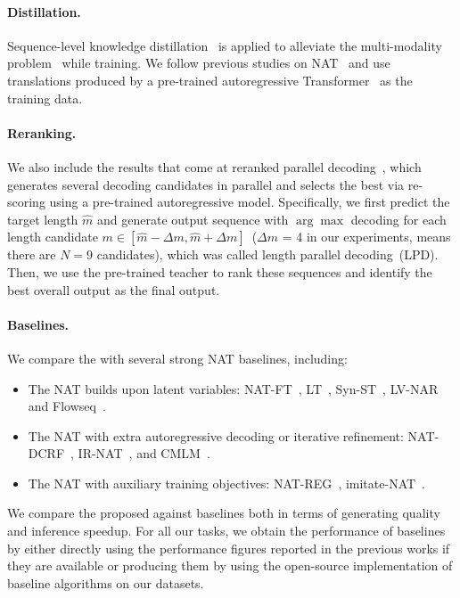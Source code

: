 \paragraph{Distillation.}
Sequence-level knowledge distillation~\citep{hinton2015distilling} is applied to alleviate the multi-modality problem~\cite{nat} while training. 
We follow previous studies on NAT~\citep{nat,iter_nat,imitate_nat} and use translations produced by a pre-trained autoregressive Transformer~\cite{transformer} as the training data.

\paragraph{Reranking.}
We also include the results that come at reranked parallel decoding~\citep{nat,enat,nat_reg,imitate_nat}, which generates several decoding candidates in parallel and selects the best via re-scoring using a pre-trained autoregressive model. 
Specifically, we first predict the target length $\hat{m}$ and generate output sequence with $\arg\max$ decoding for each length candidate $m \in [\hat{m}-\Delta m, \hat{m}+\Delta m ]$~($\Delta m$ = 4 in our experiments, means there are $N=9$ candidates), which was called length parallel decoding~(LPD). 
Then, we use the pre-trained teacher to rank these sequences and identify the best overall output as the final output.

\paragraph{Baselines.}
We compare the \method with several strong NAT baselines, including:
\begin{itemize}
    \item The NAT builds upon latent variables: NAT-FT~\cite{nat}, LT~\cite{lt}, Syn-ST~\cite{syn_st}, LV-NAR~\cite{lv_nar} and Flowseq~\cite{flowseq}.
    \item The NAT with extra autoregressive decoding or iterative refinement: NAT-DCRF~\cite{nat_crf}, IR-NAT~\cite{iter_nat}, and CMLM~\cite{cmlm}.
    \item The NAT with auxiliary training objectives: NAT-REG~\cite{nat_reg}, imitate-NAT~\cite{imitate_nat}.
\end{itemize}
We compare the proposed \method against baselines both in terms of generating quality and inference speedup. 
For all our tasks, we obtain the performance of baselines by either directly using the performance figures reported in the previous works if they are available or producing them by using the open-source implementation of baseline algorithms on our datasets. 

